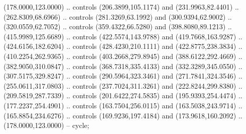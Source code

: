 
\begin{scope}[draw=black,fill=black!20,line join=round,line width=0.208pt]%
 (178.0000,123.0000) .. controls (206.3899,105.1174) and
  (231.9963,82.4401) .. (262.8309,68.6966) .. controls (281.3269,63.1992) and
  (300.9394,62.9002) .. (320.0559,62.7052) .. controls (359.4322,66.5280) and
  (398.8080,89.1213) .. (415.9989,125.6689) .. controls (422.5574,143.9788) and
  (419.7668,163.9287) .. (424.6156,182.6204) .. controls (428.4230,210.1111) and
  (422.8775,238.3834) .. (410.2254,262.9365) .. controls (403.2668,279.8945) and
  (388.6122,292.4669) .. (382.9050,310.0847) .. controls (368.7318,335.4133) and
  (332.3289,345.0550) .. (307.5175,329.8247) .. controls (290.5964,323.3461) and
  (271.7841,324.3546) .. (255.0611,317.0803) .. controls (237.7024,311.3261) and
  (222.8244,299.8380) .. (209.5819,287.7339) .. controls (201.6422,274.5835) and
  (195.9393,254.4474) .. (177.2237,254.4901) .. controls (163.7504,256.0115) and
  (163.5038,243.9714) .. (165.8854,234.6276) .. controls (169.9236,197.4184) and
  (173.9618,160.2092) .. (178.0000,123.0000) -- cycle;
\end{scope}
